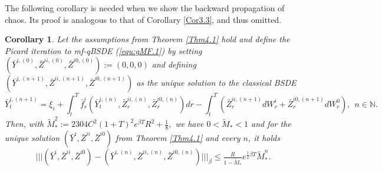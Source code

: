 \documentclass[10pt,a4paper]{article}
\theoremstyle{plain}
\newtheorem{Corollary}[Theorem]{Corollary}
\theoremstyle{definition}
\numberwithin{equation}{section}
\newcommand{\trinm}[1]{\vert\!\vert\!\vert #1 \vert\!\vert\!\vert}
\begin{document}
The following corollary is needed when we show the backward propagation of chaos. Its proof is analogous to that of Corollary \ref{Cor3.3}, and thus omitted.

\begin{Corollary}
\label{Cor4.2}
Let the assumptions from Theorem \ref{Thm4.1} hold and define the Picard iteration to mf-qBSDE \textnormal{(\ref{equ:gMF.1})} by setting $(\bar{Y}^{i,(0)},\bar{Z}^{ii,(0)},\bar{Z}^{i0,(0)}):= (0,0,0)$ and defining $(\bar{Y}^{i,(n+1)},\bar{Z}^{ii,(n+1)},\bar{Z}^{i0,(n+1)})$ as the unique solution to the classical BSDE
\[
\bar{Y}_{t}^{i,(n+1)} = \xi_{i} + \int_{t}^{T}\bar{f}_{r}^{i}(\bar{Y}_{t}^{i,(n)},\bar{Z}_{r}^{ii,(n)},\bar{Z}_{r}^{i0,(n)})dr - \int_{t}^{T}(\bar{Z}_{r}^{ii,(n+1)}dW_{r}^{i}+\bar{Z}_{r}^{i0,(n+1)}dW_{r}^{0}), \ \ n \in \mathbb{N}.
\]
Then, with
$
\tilde{M}_{*}^{2} := 2304C^{2}(1+T)^{2}e^{\beta T}R^{2} + \tfrac{1}{8},
$
we have $0<\tilde{M}_{*}<1$ and for the unique solution $(\bar{Y}^{i},\bar{Z}^{ii},\bar{Z}^{i0})$ from Theorem \ref{Thm4.1} and every $n$, it holds
\begin{equation}
\label{NdimPicard2}
\trinm{(\bar{Y}^{i},\bar{Z}^{ii},\bar{Z}^{i0})-(\bar{Y}^{i,(n)},\bar{Z}^{ii,(n)},\bar{Z}^{i0,(n)})}_\beta \leq \tfrac{R}{1-\tilde{M}_{*}}e^{\tfrac{1}{2}\beta T}\tilde{M}_{*}^{n}.
\end{equation}
\end{Corollary}
\end{document}
